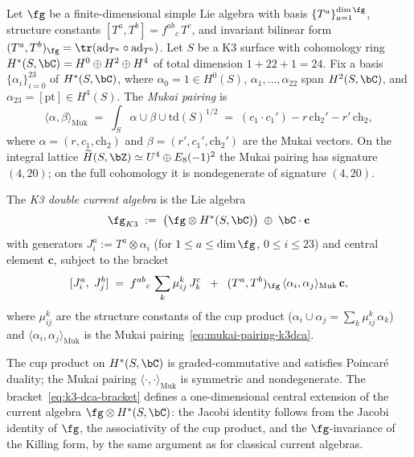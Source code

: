 \begin{definition}
\label{def:k3-double-current-algebra}
\label{def:double-current-algebra}
Let $\fg$ be a finite-dimensional simple Lie algebra with
basis $\{T^a\}_{a=1}^{\dim \fg}$,
structure constants $[T^a, T^b] = f^{ab}{}_{c}\,T^c$,
and invariant bilinear form $(T^a, T^b)_{\fg} = \tr(\mathrm{ad}_{T^a} \circ \mathrm{ad}_{T^b})$.
Let $S$ be a K3 surface with cohomology ring
$H^*(S, \bC) = H^0 \oplus H^2 \oplus H^4$ of total
dimension $1 + 22 + 1 = 24$.
Fix a basis $\{\alpha_i\}_{i=0}^{23}$ of $H^*(S, \bC)$, where
$\alpha_0 = 1 \in H^0(S)$, $\alpha_1, \ldots, \alpha_{22}$ span
$H^2(S, \bC)$, and $\alpha_{23} = [\mathrm{pt}] \in H^4(S)$.
The \emph{Mukai pairing} is
\begin{equation}\label{eq:mukai-pairing-k3dca}
 \langle \alpha, \beta \rangle_{\mathrm{Muk}}
 \;=\;
 \int_S \alpha \cup \beta \cup \mathrm{td}(S)^{1/2}
 \;=\;
 (c_1 \cdot c_1') - r\,\mathrm{ch}_2' - r'\,\mathrm{ch}_2,
\end{equation}
where $\alpha = (r, c_1, \mathrm{ch}_2)$ and $\beta = (r', c_1', \mathrm{ch}_2')$
are the Mukai vectors. On the integral lattice
$\widetilde{H}(S, \bZ) \simeq U^4 \oplus E_8(-1)^2$ the Mukai
pairing has signature $(4, 20)$; on the full cohomology it is
nondegenerate of signature $(4, 20)$.

The \emph{K3 double current algebra} is the Lie algebra
\begin{equation}\label{eq:k3-dca}
 \fg_{K3}
 \;:=\;
 \bigl(\fg \otimes H^*(S, \bC)\bigr)
 \;\oplus\;
 \bC \cdot \mathbf{c}
\end{equation}
with generators $J^a_i := T^a \otimes \alpha_i$
(for $1 \leq a \leq \dim \fg$, $0 \leq i \leq 23$)
and central element $\mathbf{c}$, subject to the bracket
\begin{equation}\label{eq:k3-dca-bracket}
 [J^a_i,\; J^b_j]
 \;=\;
 f^{ab}{}_{c}\, \sum_k \mu^k_{ij}\, J^c_k
 \;\;+\;\;
 (T^a, T^b)_{\fg}\,
 \langle \alpha_i, \alpha_j \rangle_{\mathrm{Muk}}\,
 \mathbf{c},
\end{equation}
where $\mu^k_{ij}$ are the structure constants of the cup product
($\alpha_i \cup \alpha_j = \sum_k \mu^k_{ij}\,\alpha_k$)
and $\langle \alpha_i, \alpha_j \rangle_{\mathrm{Muk}}$ is the
Mukai pairing~\eqref{eq:mukai-pairing-k3dca}.
\end{definition}

The cup product on $H^*(S,\bC)$ is graded-commutative
and satisfies Poincar\'e duality; the Mukai pairing
$\langle \cdot, \cdot \rangle_{\mathrm{Muk}}$ is symmetric and
nondegenerate. The bracket~\eqref{eq:k3-dca-bracket} defines a
one-dimensional central extension of the current algebra
$\fg \otimes H^*(S, \bC)$: the Jacobi identity follows from
the Jacobi identity of $\fg$, the associativity of the cup product,
and the $\fg$-invariance of the Killing form, by the same argument as
for classical current algebras.

